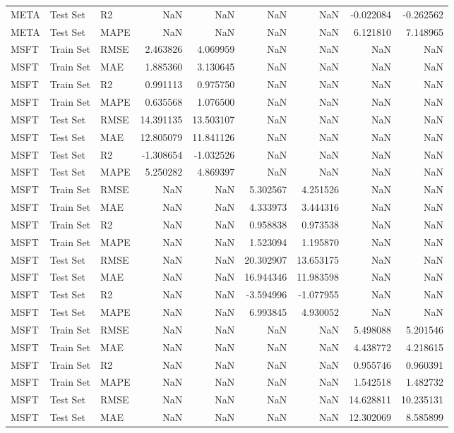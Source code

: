 \begin{tabular}{lllrrrrrr}
META & Test Set & R2 & NaN & NaN & NaN & NaN & -0.022084 & -0.262562 \\
META & Test Set & MAPE & NaN & NaN & NaN & NaN & 6.121810 & 7.148965 \\
MSFT & Train Set & RMSE & 2.463826 & 4.069959 & NaN & NaN & NaN & NaN \\
MSFT & Train Set & MAE & 1.885360 & 3.130645 & NaN & NaN & NaN & NaN \\
MSFT & Train Set & R2 & 0.991113 & 0.975750 & NaN & NaN & NaN & NaN \\
MSFT & Train Set & MAPE & 0.635568 & 1.076500 & NaN & NaN & NaN & NaN \\
MSFT & Test Set & RMSE & 14.391135 & 13.503107 & NaN & NaN & NaN & NaN \\
MSFT & Test Set & MAE & 12.805079 & 11.841126 & NaN & NaN & NaN & NaN \\
MSFT & Test Set & R2 & -1.308654 & -1.032526 & NaN & NaN & NaN & NaN \\
MSFT & Test Set & MAPE & 5.250282 & 4.869397 & NaN & NaN & NaN & NaN \\
MSFT & Train Set & RMSE & NaN & NaN & 5.302567 & 4.251526 & NaN & NaN \\
MSFT & Train Set & MAE & NaN & NaN & 4.333973 & 3.444316 & NaN & NaN \\
MSFT & Train Set & R2 & NaN & NaN & 0.958838 & 0.973538 & NaN & NaN \\
MSFT & Train Set & MAPE & NaN & NaN & 1.523094 & 1.195870 & NaN & NaN \\
MSFT & Test Set & RMSE & NaN & NaN & 20.302907 & 13.653175 & NaN & NaN \\
MSFT & Test Set & MAE & NaN & NaN & 16.944346 & 11.983598 & NaN & NaN \\
MSFT & Test Set & R2 & NaN & NaN & -3.594996 & -1.077955 & NaN & NaN \\
MSFT & Test Set & MAPE & NaN & NaN & 6.993845 & 4.930052 & NaN & NaN \\
MSFT & Train Set & RMSE & NaN & NaN & NaN & NaN & 5.498088 & 5.201546 \\
MSFT & Train Set & MAE & NaN & NaN & NaN & NaN & 4.438772 & 4.218615 \\
MSFT & Train Set & R2 & NaN & NaN & NaN & NaN & 0.955746 & 0.960391 \\
MSFT & Train Set & MAPE & NaN & NaN & NaN & NaN & 1.542518 & 1.482732 \\
MSFT & Test Set & RMSE & NaN & NaN & NaN & NaN & 14.628811 & 10.235131 \\
MSFT & Test Set & MAE & NaN & NaN & NaN & NaN & 12.302069 & 8.585899 \\

\end{tabular}
